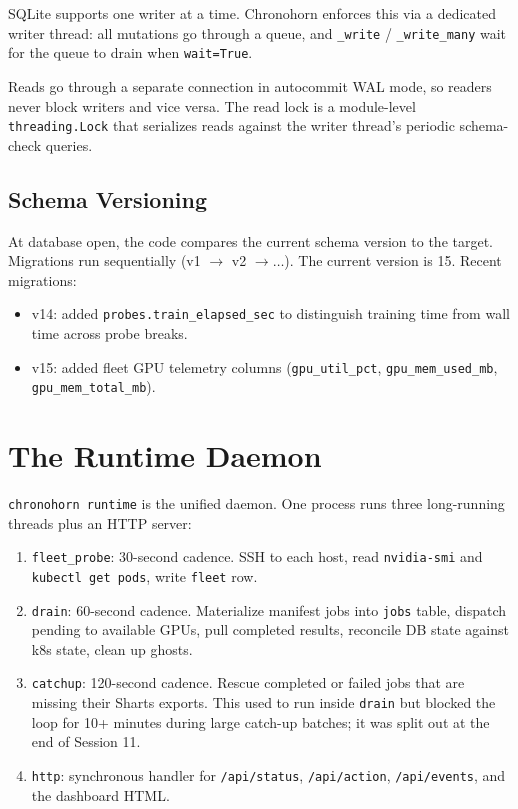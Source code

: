 \documentclass[11pt,openany]{book}
\theoremstyle{definition}
\theoremstyle{plain}
\begin{document}
SQLite supports one writer at a time. Chronohorn enforces this via a
dedicated writer thread: all mutations go through a queue, and
\texttt{\_write} / \texttt{\_write\_many} wait for the queue to drain
when \texttt{wait=True}.

Reads go through a separate connection in autocommit WAL mode, so readers
never block writers and vice versa. The read lock is a module-level
\texttt{threading.Lock} that serializes reads against the writer thread's
periodic schema-check queries.

\section{Schema Versioning}

At database open, the code compares the current schema version to the
target. Migrations run sequentially (v1 $\to$ v2 $\to \ldots$). The
current version is 15. Recent migrations:
\begin{itemize}
  \item v14: added \texttt{probes.train\_elapsed\_sec} to distinguish
    training time from wall time across probe breaks.
  \item v15: added fleet GPU telemetry columns
    (\texttt{gpu\_util\_pct}, \texttt{gpu\_mem\_used\_mb},
    \texttt{gpu\_mem\_total\_mb}).
\end{itemize}

\chapter{The Runtime Daemon}
\label{ch:runtime}

\texttt{chronohorn runtime} is the unified daemon. One process runs
three long-running threads plus an HTTP server:
\begin{enumerate}
  \item \texttt{fleet\_probe}: 30-second cadence. SSH to each host,
    read \texttt{nvidia-smi} and \texttt{kubectl get pods}, write
    \texttt{fleet} row.
  \item \texttt{drain}: 60-second cadence. Materialize manifest jobs
    into \texttt{jobs} table, dispatch pending to available GPUs,
    pull completed results, reconcile DB state against k8s state,
    clean up ghosts.
  \item \texttt{catchup}: 120-second cadence. Rescue completed or
    failed jobs that are missing their Sharts exports. This used to
    run inside \texttt{drain} but blocked the loop for 10+ minutes
    during large catch-up batches; it was split out at the end of
    Session 11.
  \item \texttt{http}: synchronous handler for \texttt{/api/status},
    \texttt{/api/action}, \texttt{/api/events}, and the dashboard HTML.
\end{enumerate}
\end{document}
